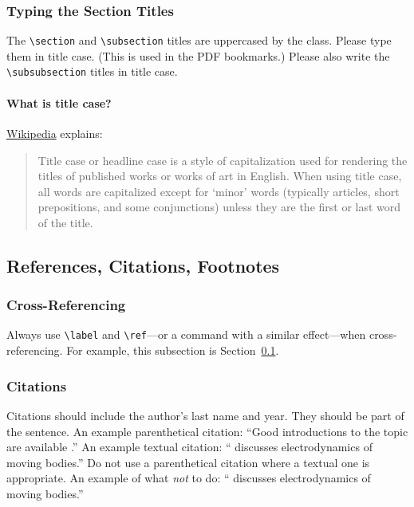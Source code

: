 \documentclass{uai2023} %
\begin{document}
\subsubsection{Typing the Section Titles}
The \verb|\section| and \verb|\subsection| titles are uppercased by the class.
Please type them in title case.
(This is used in the PDF bookmarks.)
Please also write the \verb|\subsubsection| titles in title case.

\paragraph{What is title case?}
\href{https://en.wikipedia.org/wiki/Title_case}{Wikipedia} explains:
\begin{quote}
    Title case or headline case is a style of capitalization used for rendering the titles of published works or works of art in English.
    When using title case, all words are capitalized except for ‘minor’ words (typically articles, short prepositions, and some conjunctions) unless they are the first or last word of the title.
\end{quote}

\subsection{References, Citations, Footnotes}\label{sec:etc}
\subsubsection{Cross-Referencing}
Always use \verb|\label| and \verb|\ref|—or a command with a similar effect—when cross-referencing.
For example, this subsection is Section~\ref{sec:etc}.

\subsubsection{Citations}
Citations should include the author's last name and year.
They should be part of the sentence.
An example parenthetical citation: “Good introductions to the topic are available \citep{latexcompanion}.”
An example textual citation: “\citet{einstein} discusses electrodynamics of moving bodies.”
Do not use a parenthetical citation where a textual one is appropriate.
An example of what \emph{not} to do: “\citep{einstein} discusses electrodynamics of moving bodies.”
\end{document}
